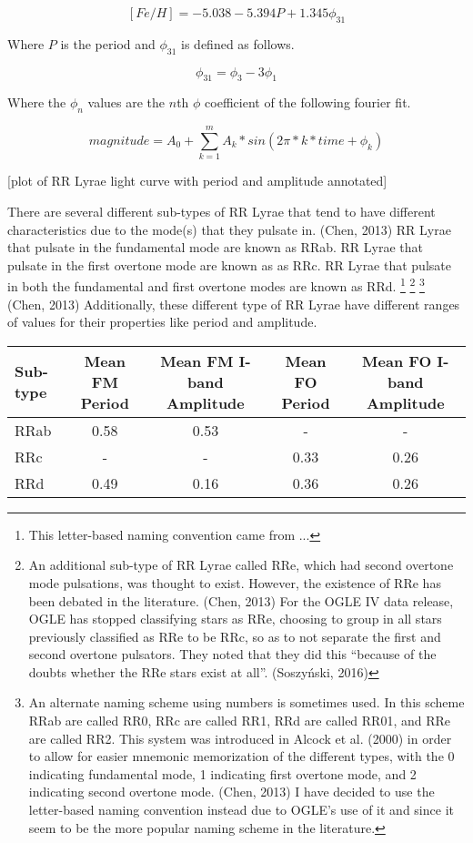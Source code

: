 \documentclass[]{article}
\begin{document}
$$
[Fe/H] = -5.038 - 5.394 P + 1.345 \phi_{31}
$$

Where $P$ is the period and $\phi_{31}$ is defined as follows.

$$
\phi_{31} = \phi_{3} - 3\phi_{1}
$$

Where the $\phi_{n}$ values are the $n$th $\phi$ coefficient of the following fourier fit.

$$
magnitude = A_{0} + \sum_{k=1}^{m} A_k * sin(2\pi * k * time + \phi_{k})
$$

[plot of RR Lyrae light curve with period and amplitude annotated]

There are several different sub-types of RR Lyrae that tend to have different characteristics due to the mode(s) that they pulsate in. (Chen, 2013) RR Lyrae that pulsate in the fundamental mode are known as RRab. RR Lyrae that pulsate in the first overtone mode are known as as RRc. RR Lyrae that pulsate in both the fundamental and first overtone modes are known as RRd. \footnote{This letter-based naming convention came from ...} \footnote{An additional sub-type of RR Lyrae called RRe, which had second overtone mode pulsations, was thought to exist. However, the existence of RRe has been debated in the literature. (Chen, 2013) For the OGLE IV data release, OGLE has stopped classifying stars as RRe, choosing to group in all stars previously classified as RRe to be RRc, so as to not separate the first and second overtone pulsators. They noted that they did this “because of the doubts whether the RRe stars exist at all”. (Soszyński, 2016)} \footnote{An alternate naming scheme using numbers is sometimes used. In this scheme RRab are called RR0, RRc are called RR1, RRd are called RR01, and RRe are called RR2. This system was introduced in Alcock et al. (2000) in order to allow for easier mnemonic memorization of the different types, with the 0 indicating fundamental mode, 1 indicating first overtone mode, and 2 indicating second overtone mode. (Chen, 2013) I have decided to use the letter-based naming convention instead due to OGLE’s use of it and since it seem to be the more popular naming scheme in the literature.} (Chen, 2013) Additionally, these different type of RR Lyrae have different ranges of values for their properties like period and amplitude.


\begin{center}
\begin{tabular}{|l|c|c|c|c|}
	\hline
	Sub-type & Mean FM Period & Mean FM I-band Amplitude & Mean FO Period & Mean FO I-band Amplitude \\
	\hline
	RRab & 0.58 & 0.53 & - & - \\
	RRc & - & - & 0.33 & 0.26 \\
	RRd & 0.49 & 0.16 & 0.36 & 0.26 \\
	\hline
\end{tabular}
\end{center}
\end{document}
